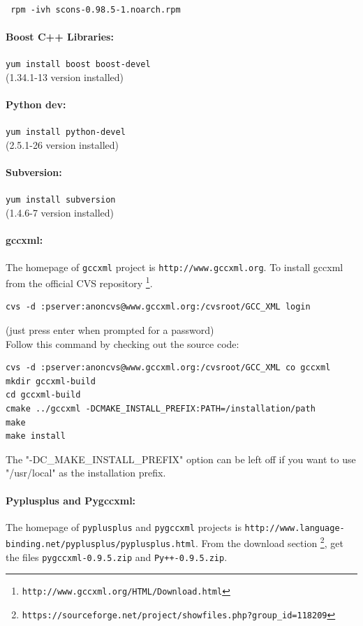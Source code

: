 \documentclass[12pt,a4paper]{article}
\begin{document}
\begin{verbatim}
 rpm -ivh scons-0.98.5-1.noarch.rpm
\end{verbatim}

\paragraph{Boost C++ Libraries:} {\tt yum install boost boost-devel} \\
(1.34.1-13 version installed)


\paragraph{Python dev:} {\tt yum install python-devel} \\
(2.5.1-26 version installed)

\paragraph{Subversion:} {\tt yum install subversion} \\
(1.4.6-7 version installed)

\paragraph{gccxml:}The homepage of {\tt gccxml} project is {\tt http://www.gccxml.org}. 
To install gccxml from the official CVS repository \footnote{\tt http://www.gccxml.org/HTML/Download.html}.

\begin{verbatim}
cvs -d :pserver:anoncvs@www.gccxml.org:/cvsroot/GCC_XML login
\end{verbatim}
(just press enter when prompted for a password)\\
Follow this command by checking out the source code:
\begin{verbatim}
cvs -d :pserver:anoncvs@www.gccxml.org:/cvsroot/GCC_XML co gccxml
mkdir gccxml-build
cd gccxml-build
cmake ../gccxml -DCMAKE_INSTALL_PREFIX:PATH=/installation/path
make
make install
\end{verbatim}
The "-DC\_MAKE\_INSTALL\_PREFIX" option can be left off if you want to use "/usr/local" as the installation prefix.


\paragraph{Pyplusplus and Pygccxml: }
The homepage of {\tt pyplusplus} and {\tt pygccxml} projects is 
{\tt http://www.language-binding.net/pyplusplus/pyplusplus.html}. From the
download section \footnote{\tt https://sourceforge.net/project/showfiles.php?group\_id=118209}, 
get the files {\tt pygccxml-0.9.5.zip} and {\tt Py++-0.9.5.zip}.
\end{document}

